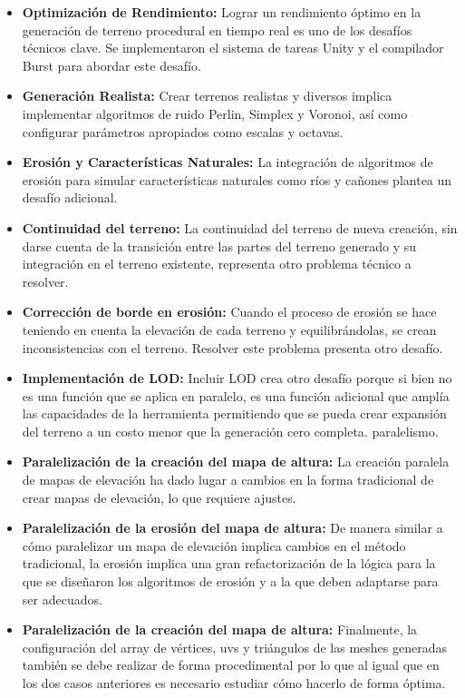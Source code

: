\begin{itemize}
    \item \textbf{Optimización de Rendimiento:} Lograr un rendimiento óptimo en la generación de terreno procedural en tiempo real es uno de los desafíos técnicos clave. Se implementaron el sistema de tareas Unity y el compilador Burst para abordar este desafío.
    
    \item \textbf{Generación Realista:} Crear terrenos realistas y diversos implica implementar algoritmos de ruido Perlin, Simplex y Voronoi, así como configurar parámetros apropiados como escalas y octavas.
    
    \item \textbf{Erosión y Características Naturales:} La integración de algoritmos de erosión para simular características naturales como ríos y cañones plantea un desafío adicional. 
    
    \item \textbf{Continuidad del terreno:} La continuidad del terreno de nueva creación, sin darse cuenta de la transición entre las partes del terreno generado y su integración en el terreno existente, representa otro problema técnico a resolver.
    
    \item \textbf{Corrección de borde en erosión:} Cuando el proceso de erosión se hace teniendo en cuenta la elevación de cada terreno y equilibrándolas, se crean inconsistencias con el terreno. Resolver este problema presenta otro desafío.
    
    \item \textbf{Implementación de LOD:} Incluir LOD crea otro desafío porque si bien no es una función que se aplica en paralelo, es una función adicional que amplía las capacidades de la herramienta permitiendo que se pueda crear expansión del terreno a un costo menor que la generación cero completa. paralelismo.
    
    \item \textbf{Paralelización de la creación del mapa de altura:} La creación paralela de mapas de elevación ha dado lugar a cambios en la forma tradicional de crear mapas de elevación, lo que requiere ajustes.
     
    \item \textbf{Paralelización de la erosión del mapa de altura:} De manera similar a cómo paralelizar un mapa de elevación implica cambios en el método tradicional, la erosión implica una gran refactorización de la lógica para la que se diseñaron los algoritmos de erosión y a la que deben adaptarse para ser adecuados.
     
    \item \textbf{Paralelización de la creación del mapa de altura:} Finalmente, la configuración del array de vértices, uvs y triángulos de las meshes generadas también se debe realizar de forma procedimental por lo que al igual que en los dos casos anteriores es necesario estudiar cómo hacerlo de forma óptima. 
\end{itemize}

